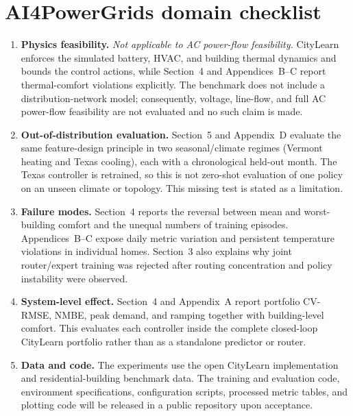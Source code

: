 \section*{AI4PowerGrids domain checklist}

\begin{enumerate}
  \item \textbf{Physics feasibility.}
  \emph{Not applicable to AC power-flow feasibility.} CityLearn enforces the
  simulated battery, HVAC, and building thermal dynamics and bounds the control
  actions, while Section~4 and Appendices~B--C report thermal-comfort violations
  explicitly. The benchmark does not include a distribution-network model;
  consequently, voltage, line-flow, and full AC power-flow feasibility are not
  evaluated and no such claim is made.

  \item \textbf{Out-of-distribution evaluation.}
  Section~5 and Appendix~D evaluate the same feature-design principle in two
  seasonal/climate regimes (Vermont heating and Texas cooling), each with a
  chronological held-out month. The Texas controller is retrained, so this is
  not zero-shot evaluation of one policy on an unseen climate or topology. This
  missing test is stated as a limitation.

  \item \textbf{Failure modes.}
  Section~4 reports the reversal between mean and worst-building comfort and
  the unequal numbers of training episodes. Appendices~B--C expose daily metric variation
  and persistent temperature violations in individual homes. Section~3 also
  explains why joint router/expert training was rejected after routing
  concentration and policy instability were observed.

  \item \textbf{System-level effect.}
  Section~4 and Appendix~A report portfolio CV-RMSE, NMBE, peak demand, and
  ramping together with building-level comfort. This evaluates each controller
  inside the complete closed-loop CityLearn portfolio rather than as a
  standalone predictor or router.

  \item \textbf{Data and code.}
  The experiments use the open CityLearn implementation and residential-building
  benchmark data. The training and evaluation code, environment specifications,
  configuration scripts, processed metric tables, and plotting code will be
  released in a public repository upon acceptance.
\end{enumerate}

